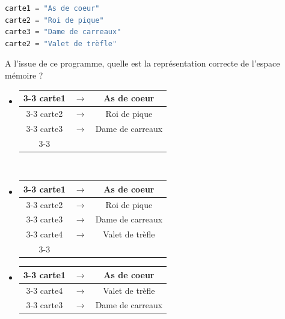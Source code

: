 \begin{Quizz}
\begin{lstlisting}[style=pythonstyle, language=Python]
carte1 = "As de coeur"  
carte2 = "Roi de pique" 
carte3 = "Dame de carreaux"  
carte2 = "Valet de trèfle"  
\end{lstlisting}
A l'issue de ce programme, quelle est la représentation correcte de l'espace mémoire ?\\
\begin{minipage}{0.49\textwidth}
    \begin{itemize}
    \renewcommand{\labelitemi}{$\square$}
    \item     \begin{tabular}{c c |c|}
    \cline{3-3}
        carte1 & $\mathbf{\rightarrow}$ &  As de coeur\\
        \cline{3-3}
        carte2 & $\mathbf{\rightarrow}$ &  Roi de pique\\
        \cline{3-3}
        carte3 & $\mathbf{\rightarrow}$ & Dame de carreaux\\
        \cline{3-3}
    \end{tabular} \\[0.5cm]
    \item      \begin{tabular}{c c |c|}
    \cline{3-3}
        carte1 & $\mathbf{\rightarrow}$ &  As de coeur\\
        \cline{3-3}
        carte2 & $\mathbf{\rightarrow}$ &   Roi de pique\\
        \cline{3-3}
        carte3 & $\mathbf{\rightarrow}$ &   Dame de carreaux\\
        \cline{3-3}
          carte4 & $\mathbf{\rightarrow}$ &   Valet de trèfle\\
          \cline{3-3}
    \end{tabular} 
    \end{itemize}
\end{minipage}\begin{minipage}{0.49\textwidth}
    \begin{itemize}
    \renewcommand{\labelitemi}{$\square$}
    \item     \begin{tabular}{c c |c|}
    \cline{3-3}
        carte1 & $\mathbf{\rightarrow}$ &  As de coeur\\
        \cline{3-3}
        carte4 & $\mathbf{\rightarrow}$ &   Valet de trèfle\\
        \cline{3-3}
        carte3 & $\mathbf{\rightarrow}$ &   Dame de carreaux\\

\end{tabular}
\end{itemize}
\end{minipage}
\end{Quizz}
